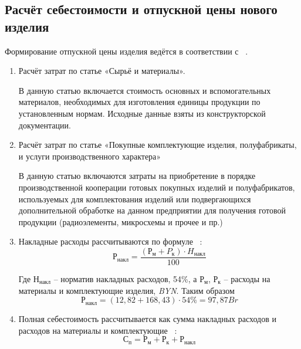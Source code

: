 \subsection{Расчёт себестоимости и отпускной цены нового изделия}

Формирование отпускной цены изделия ведётся в соответствии с
~\cite{bsuir-project-economics}.

\begin{enumerate}
\item Расчёт затрат по статье «Сырьё и материалы».

  В данную статью включается стоимость основных и вспомогательных
  материалов, необходимых для изготовления единицы продукции по
  установленным нормам. Исходные данные взяты из конструкторской
  документации.
  
  

\item Расчёт затрат по статье «Покупные комплектующие изделия,
  полуфабрикаты, и услуги производственного характера»

  В данную статью включаются затраты на приобретение в порядке
  производственной кооперации готовых покупных изделий и полуфабрикатов,
  используемых для комплектования изделий или подвергающихся
  дополнительной обработке на данном предприятии для получения готовой
  продукции (радиоэлементы, микросхемы и прочее и пр.)

  



  
\item Накладные расходы рассчитываются по формуле ~\cite{bsuir-project-economics}:
\begin{equation}
  Р_{накл}=\frac{(Р_м+P_к) \cdot H_{накл}}{100}
\end{equation}

Где  $Н_{накл}$ – норматив накладных расходов, 54\%, а $Р_м$, $Р_к$ – расходы на материалы и комплектующие изделия, \textit{BYN}.
Таким образом
$$  Р_{накл}=(12,82+168,43) \cdot 54\%  = 97,87 Br$$

\item Полная себестоимость рассчитывается как сумма накладных расходов и
расходов на материалы и комплектующие ~\cite{bsuir-project-economics}:
\begin{equation}
  С_п =Р_м + Р_к + Р_{накл}
\end{equation} 


\end{enumerate}
